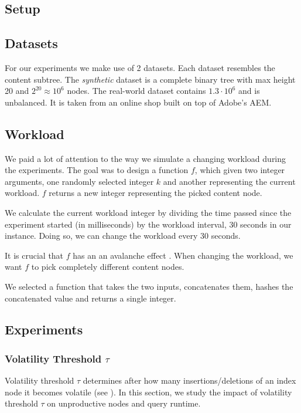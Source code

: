 \documentclass[abstracton,12pt]{scrartcl}
\theoremstyle{definition}
\begin{document}
\subsection{Setup}

\subsection{Datasets}

For our experiments we make use of 2 datasets. Each dataset resembles the
content subtree. The \textit{synthetic} dataset is a complete binary tree with
max height 20 and $2^20 \approx 10^6$ nodes. The real-world dataset contains
$1.3 \cdot 10^6$ and is unbalanced. It is taken from an online shop built on top
of Adobe's AEM.

\subsection{Workload}

We paid a lot of attention to the way we simulate a changing workload during the
experiments. The goal was to design a function $f$, which given two integer
arguments, one randomly selected integer $k$ and another representing the
current workload. $f$ returns a new integer representing the picked content node.

We calculate the current workload integer by dividing the time passed since the
experiment started (in milliseconds) by the workload interval, 30 seconds in our
instance. Doing so, we can change the workload every 30 seconds.

It is crucial that $f$ has an an avalanche effect \cite{HF73}. When changing the
workload, we want $f$ to pick completely different content nodes.

We selected a function that takes the two inputs, concatenates them, hashes the
concatenated value and returns a single integer.

\subsection{Experiments}

\subsubsection{Volatility Threshold $\tau$}

Volatility threshold $\tau$ determines after how many insertions/deletions of an index node
it becomes volatile (see ). In this section, we study the impact of
volatility threshold $\tau$ on unproductive nodes and query runtime.
\end{document}
